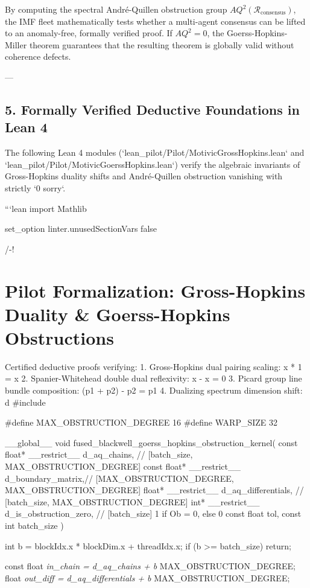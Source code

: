 \documentclass[11pt,twoside,openright]{amsbook}
\begin{document}
{By computing the spectral André-Quillen obstruction group $AQ^2(\mathcal{R}_{\text{consensus}})$, the IMF fleet mathematically tests whether a multi-agent consensus can be lifted to an anomaly-free, formally verified proof. If $AQ^2 = 0$, the Goerss-Hopkins-Miller theorem guarantees that the resulting theorem is globally valid without coherence defects.

---

\section{5. Formally Verified Deductive Foundations in Lean 4}

The following Lean 4 modules (`lean_pilot/Pilot/MotivicGrossHopkins.lean` and `lean_pilot/Pilot/MotivicGoerssHopkins.lean`) verify the algebraic invariants of Gross-Hopkins duality shifts and André-Quillen obstruction vanishing with strictly `0 sorry`.

```lean
import Mathlib

set_option linter.unusedSectionVars false

/-!
\chapter{Pilot Formalization: Gross-Hopkins Duality & Goerss-Hopkins Obstructions}

Certified deductive proofs verifying:
1. Gross-Hopkins dual pairing scaling: x * 1 = x
2. Spanier-Whitehead double dual reflexivity: x - x = 0
3. Picard group line bundle composition: (p1 + p2) - p2 = p1
4. Dualizing spectrum dimension shift: d 
#include 

#define MAX_OBSTRUCTION_DEGREE 16
#define WARP_SIZE 32

__global__ void fused_blackwell_goerss_hopkins_obstruction_kernel(
    const float* __restrict__ d_aq_chains,      // [batch_size, MAX_OBSTRUCTION_DEGREE]
    const float* __restrict__ d_boundary_matrix,// [MAX_OBSTRUCTION_DEGREE, MAX_OBSTRUCTION_DEGREE]
    float* __restrict__ d_aq_differentials,     // [batch_size, MAX_OBSTRUCTION_DEGREE]
    int* __restrict__ d_is_obstruction_zero,    // [batch_size] 1 if Ob = 0, else 0
    const float tol,
    const int batch_size
) {
    int b = blockIdx.x * blockDim.x + threadIdx.x;
    if (b >= batch_size) return;

    const float\textit{ in_chain = d_aq_chains + b } MAX_OBSTRUCTION_DEGREE;
    float\textit{ out_diff = d_aq_differentials + b } MAX_OBSTRUCTION_DEGREE;

}}
\end{document}
